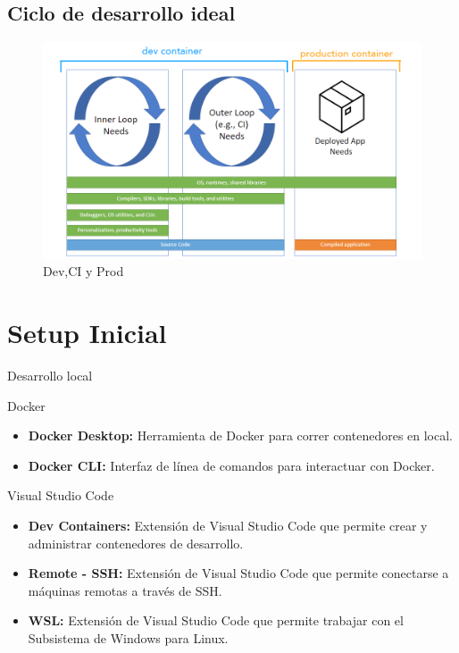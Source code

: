 \documentclass{beamer}
\begin{document}
\subsection{Ciclo de desarrollo ideal}
\begin{frame}{\subsecname}
  \begin{figure}
    \centering
    \includegraphics[width=\textwidth]{images/dev-container-stages.png}
    \caption{Dev,CI y Prod}
  \end{figure}
\end{frame}

\section{Setup Inicial}
\begin{frame}{Desarrollo local}
  \begin{block}{Docker}
    \begin{itemize}
      \item \textbf{Docker Desktop:} Herramienta de Docker para correr contenedores en local.
      \item \textbf{Docker CLI:} Interfaz de línea de comandos para interactuar con Docker.
    \end{itemize}
  \end{block}
  \begin{block}{Visual Studio Code}
    \begin{itemize}
      \item \textbf{Dev Containers:} Extensión de Visual Studio Code que permite crear y administrar contenedores de desarrollo.
      \item \textbf{Remote - SSH:} Extensión de Visual Studio Code que permite conectarse a máquinas remotas a través de SSH.
      \item \textbf{WSL:} Extensión de Visual Studio Code que permite trabajar con el Subsistema de Windows para Linux.
    \end{itemize}
  \end{block}
\end{frame}
\end{document}

